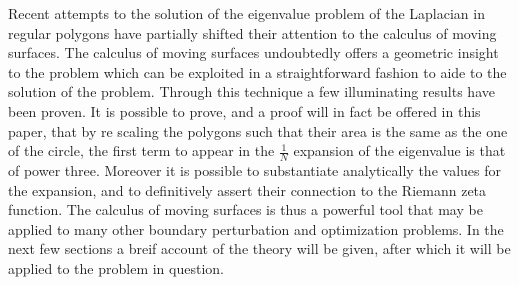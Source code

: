 \documentclass[../main.tex]{subfiles}
\begin{document}
    Recent attempts to the solution of the eigenvalue problem \cite{grinfeld2004laplacian} \cite{grinfeld2012laplace} of the Laplacian in regular polygons have partially shifted their attention to the calculus of moving surfaces. The calculus of moving surfaces undoubtedly offers a geometric insight to the problem which can be exploited in a straightforward fashion to aide to the solution of the problem. Through this technique a few illuminating results have been proven. It is possible to prove, and a proof will in fact be offered in this paper, that by re scaling the polygons such that their area is the same as the one of the circle, the first term to appear in the $\frac{1}{N}$ expansion of the eigenvalue is that of power three. Moreover it is possible to substantiate analytically the values for the expansion, and to definitively assert their connection to the Riemann zeta function. The calculus of moving surfaces is thus a powerful tool that may be applied to many other boundary perturbation and optimization problems. In the next few sections a breif account of the theory will be given, after which it will be applied to the problem in question.
\end{document}
